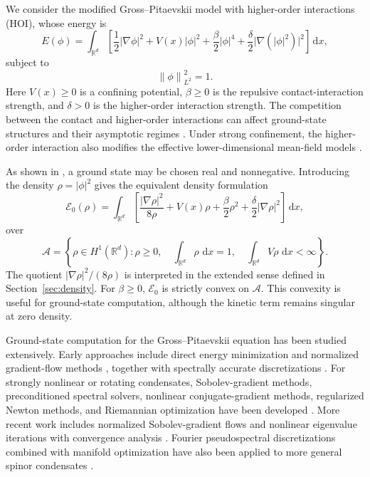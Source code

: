 \documentclass[11pt]{article}
\newcommand{\R}{\mathbb{R}}
\newcommand{\A}{\mathcal{A}}
\newcommand{\E}{\mathcal{E}}
\newcommand{\dd}{\,\mathrm{d}}
\newcommand{\norm}[1]{\left\|#1\right\|}
\newcommand{\grad}{\nabla}
\newcommand{\half}{\frac12}
\theoremstyle{plain}
\theoremstyle{definition}
\numberwithin{equation}{section}
\begin{document}
We consider the modified Gross--Pitaevskii model with higher-order
interactions (HOI), whose energy is
\begin{equation}
\label{eq:wave-energy}
E(\phi)
=
\int_{\R^d}
\left[
\half |\grad\phi|^2
+V(x)|\phi|^2
+\frac{\beta}{2}|\phi|^4
+\frac{\delta}{2}\bigl|\grad(|\phi|^2)\bigr|^2
\right]\dd x,
\end{equation}
subject to
\begin{equation}
\label{eq:wave-mass}
\norm{\phi}_{L^2}^2=1.
\end{equation}
Here $V(x)\ge0$ is a confining potential, $\beta\ge 0$ is the repulsive
contact-interaction strength, and $\delta>0$ is the higher-order
interaction strength. The competition between the contact and
higher-order interactions can affect ground-state structures and
their asymptotic regimes \cite{BaoCaiRuan2019,RuanCaiBao2016}. Under
strong confinement, the higher-order interaction also modifies the
effective lower-dimensional mean-field models
\cite{RuanCaiBao2016}.

As shown in \cite{BaoCaiRuan2019}, a ground state may be chosen real
and nonnegative. Introducing the density $\rho=|\phi|^2$ gives the
equivalent density formulation
\begin{equation}
\label{eq:density-energy}
\E_0(\rho)
=
\int_{\R^d}
\left[
\frac{|\grad\rho|^2}{8\rho}
+V(x)\rho
+\frac{\beta}{2}\rho^2
+\frac{\delta}{2}|\grad\rho|^2
\right]\dd x,
\end{equation}
over
\begin{equation}
\label{eq:admissible-density}
\A
=
\left\{
\rho\in H^1(\R^d):
\rho\ge0,\quad
\int_{\R^d}\rho\,\dd x=1,\quad
\int_{\R^d}V\rho\,\dd x<\infty
\right\}.
\end{equation}
The quotient $|\grad\rho|^2/(8\rho)$ is interpreted in the extended
sense defined in Section~\ref{sec:density}. For $\beta\ge0$,
$\E_0$ is strictly convex on $\A$. This convexity is useful for
ground-state computation, although the kinetic term remains singular
at zero density.


Ground-state computation for the Gross--Pitaevskii equation has been
studied extensively. Early approaches include direct energy
minimization and normalized gradient-flow methods
\cite{BaoDu2004,BaoTang2003}, together with spectrally accurate
discretizations \cite{BaoChernLim2006}. For strongly nonlinear or
rotating condensates, Sobolev-gradient methods, preconditioned
spectral solvers, nonlinear conjugate-gradient methods, regularized
Newton methods, and Riemannian optimization have been developed
\cite{AntoineDuboscq2014,AntoineLevittTang2017,
DanailaKazemi2010,DanailaProtas2017,WuWenBao2017}. More recent work
includes normalized Sobolev-gradient flows and nonlinear eigenvalue
iterations with convergence analysis
\cite{AltmannHenningPeterseim2021,ChenLuLuZhang2024,
HenningPeterseim2020}. Fourier pseudospectral discretizations combined
with manifold optimization have also been applied to more general
spinor condensates \cite{TianCaiWuWen2020}.
\end{document}

